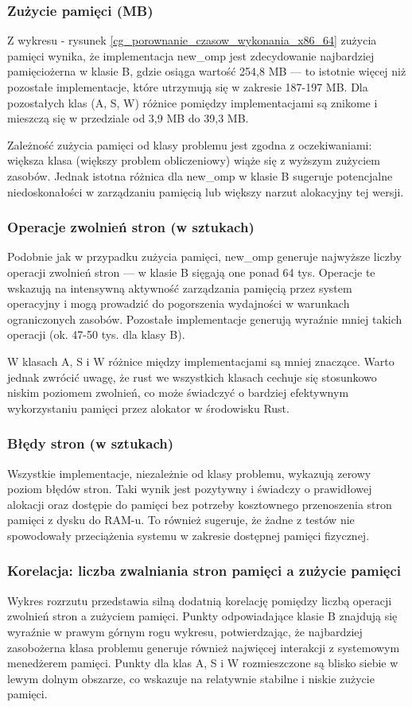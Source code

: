 \subsubsection{Zużycie pamięci (MB)}
Z wykresu - rysunek \ref{cg_porownanie_czasow_wykonania_x86_64} zużycia pamięci wynika, że implementacja new\_omp jest zdecydowanie najbardziej pamięciożerna w klasie B, gdzie osiąga wartość 254,8 MB — to istotnie więcej niż pozostałe implementacje, które utrzymują się w zakresie 187-197 MB. Dla pozostałych klas (A, S, W) różnice pomiędzy implementacjami są znikome i mieszczą się w przedziale od 3,9 MB do 39,3 MB.

Zależność zużycia pamięci od klasy problemu jest zgodna z oczekiwaniami: większa klasa (większy problem obliczeniowy) wiąże się z wyższym zużyciem zasobów. Jednak istotna różnica dla new\_omp w klasie B sugeruje potencjalne niedoskonałości w zarządzaniu pamięcią lub większy narzut alokacyjny tej wersji.

\subsubsection{Operacje zwolnień stron (w sztukach)}
Podobnie jak w przypadku zużycia pamięci, new\_omp generuje najwyższe liczby operacji zwolnień stron — w klasie B sięgają one ponad 64 tys. Operacje te wskazują na intensywną aktywność zarządzania pamięcią przez system operacyjny i mogą prowadzić do pogorszenia wydajności w warunkach ograniczonych zasobów. Pozostałe implementacje generują wyraźnie mniej takich operacji (ok. 47-50 tys. dla klasy B).

W klasach A, S i W różnice między implementacjami są mniej znaczące. Warto jednak zwrócić uwagę, że rust we wszystkich klasach cechuje się stosunkowo niskim poziomem zwolnień, co może świadczyć o bardziej efektywnym wykorzystaniu pamięci przez alokator w środowisku Rust.

\subsubsection{Błędy stron (w sztukach)}
Wszystkie implementacje, niezależnie od klasy problemu, wykazują zerowy poziom błędów stron. Taki wynik jest pozytywny i świadczy o prawidłowej alokacji oraz dostępie do pamięci bez potrzeby kosztownego przenoszenia stron pamięci z dysku do RAM-u. To również sugeruje, że żadne z testów nie spowodowały przeciążenia systemu w zakresie dostępnej pamięci fizycznej.

\subsubsection{Korelacja: liczba zwalniania stron pamięci a zużycie pamięci}
Wykres rozrzutu przedstawia silną dodatnią korelację pomiędzy liczbą operacji zwolnień stron a zużyciem pamięci. Punkty odpowiadające klasie B znajdują się wyraźnie w prawym górnym rogu wykresu, potwierdzając, że najbardziej zasobożerna klasa problemu generuje również najwięcej interakcji z systemowym menedżerem pamięci. Punkty dla klas A, S i W rozmieszczone są blisko siebie w lewym dolnym obszarze, co wskazuje na relatywnie stabilne i niskie zużycie pamięci.

